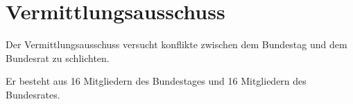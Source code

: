 \documentclass{article}
\begin{document}
\section{Vermittlungsausschuss} 
Der Vermittlungsausschuss versucht konflikte zwischen dem Bundestag und dem Bundesrat zu schlichten.

Er besteht aus 16 Mitgliedern des Bundestages und 16 Mitgliedern des Bundesrates.
\end{document}
